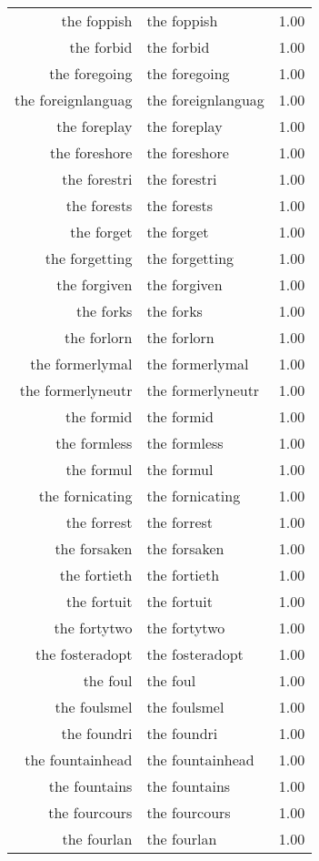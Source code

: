 \begin{table}[ht]
\begin{tabular}{rlr}
  the foppish & the foppish & 1.00 \\ 
  the forbid & the forbid & 1.00 \\ 
  the foregoing & the foregoing & 1.00 \\ 
  the foreignlanguag & the foreignlanguag & 1.00 \\ 
  the foreplay & the foreplay & 1.00 \\ 
  the foreshore & the foreshore & 1.00 \\ 
  the forestri & the forestri & 1.00 \\ 
  the forests & the forests & 1.00 \\ 
  the forget & the forget & 1.00 \\ 
  the forgetting & the forgetting & 1.00 \\ 
  the forgiven & the forgiven & 1.00 \\ 
  the forks & the forks & 1.00 \\ 
  the forlorn & the forlorn & 1.00 \\ 
  the formerlymal & the formerlymal & 1.00 \\ 
  the formerlyneutr & the formerlyneutr & 1.00 \\ 
  the formid & the formid & 1.00 \\ 
  the formless & the formless & 1.00 \\ 
  the formul & the formul & 1.00 \\ 
  the fornicating & the fornicating & 1.00 \\ 
  the forrest & the forrest & 1.00 \\ 
  the forsaken & the forsaken & 1.00 \\ 
  the fortieth & the fortieth & 1.00 \\ 
  the fortuit & the fortuit & 1.00 \\ 
  the fortytwo & the fortytwo & 1.00 \\ 
  the fosteradopt & the fosteradopt & 1.00 \\ 
  the foul & the foul & 1.00 \\ 
  the foulsmel & the foulsmel & 1.00 \\ 
  the foundri & the foundri & 1.00 \\ 
  the fountainhead & the fountainhead & 1.00 \\ 
  the fountains & the fountains & 1.00 \\ 
  the fourcours & the fourcours & 1.00 \\ 
  the fourlan & the fourlan & 1.00 \\ 

\end{tabular}
\end{table}
